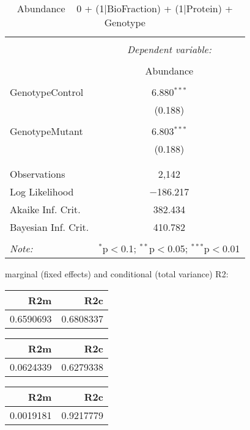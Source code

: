 \documentclass[11pt]{report}
\begin{document}
\begin{table}[!htbp] \centering 
  \caption{Abundance ~ 0 + (1|BioFraction) + (1|Protein) + Genotype} 
  \label{} 
\begin{tabular}{@{\extracolsep{5pt}}lc} 
\\[-1.8ex]\hline 
\hline \\[-1.8ex] 
 & \multicolumn{1}{c}{\textit{Dependent variable:}} \\ 
\cline{2-2} 
\\[-1.8ex] & Abundance \\ 
\hline \\[-1.8ex] 
 GenotypeControl & 6.880$^{***}$ \\ 
  & (0.188) \\ 
  & \\ 
 GenotypeMutant & 6.803$^{***}$ \\ 
  & (0.188) \\ 
  & \\ 
\hline \\[-1.8ex] 
Observations & 2,142 \\ 
Log Likelihood & $-$186.217 \\ 
Akaike Inf. Crit. & 382.434 \\ 
Bayesian Inf. Crit. & 410.782 \\ 
\hline 
\hline \\[-1.8ex] 
\textit{Note:}  & \multicolumn{1}{r}{$^{*}$p$<$0.1; $^{**}$p$<$0.05; $^{***}$p$<$0.01} \\ 
\end{tabular} 
\end{table} 
marginal (fixed effects) and conditional (total variance) R2:

\begin{tabular}{r|r}
\hline
R2m & R2c\\
\hline
0.6590693 & 0.6808337\\
\hline
\end{tabular}

\begin{tabular}{r|r}
\hline
R2m & R2c\\
\hline
0.0624339 & 0.6279338\\
\hline
\end{tabular}

\begin{tabular}{r|r}
\hline
R2m & R2c\\
\hline
0.0019181 & 0.9217779\\
\hline
\end{tabular}
\end{document}
